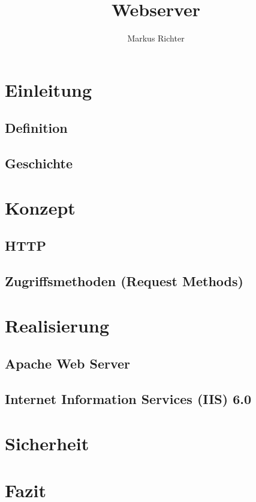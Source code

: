 \documentclass[a4paper,11pt]{article}
\title{Webserver}
\author{Markus Richter}
\begin{document}
\maketitle
\tableofcontents

\begin{abstract}
\end{abstract}

\section{Einleitung}
\subsection{Definition}
\subsection{Geschichte}

\section{Konzept}
\subsection{HTTP}
\subsection{Zugriffsmethoden (Request Methods)}

\section{Realisierung}
\subsection{Apache Web Server}
\subsection{Internet Information Services (IIS) 6.0}

\section{Sicherheit}

\section{Fazit}
\end{document}
